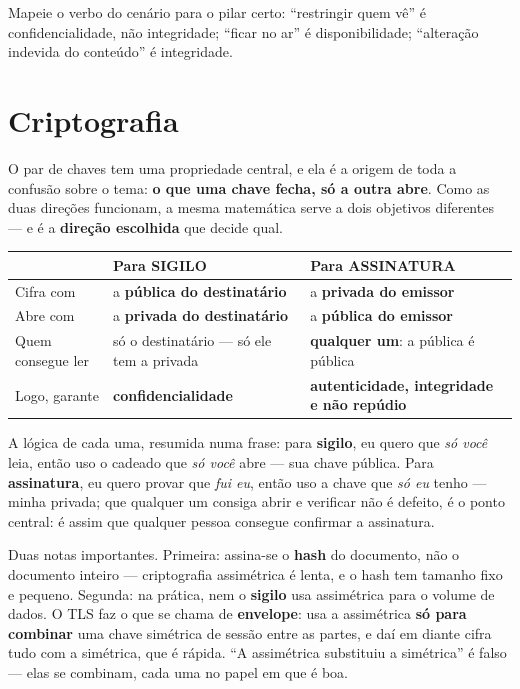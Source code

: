 \begin{cuidado}
Mapeie o verbo do cenário para o pilar certo: “restringir quem vê” é
confidencialidade, não integridade; “ficar no ar” é disponibilidade;
“alteração indevida do conteúdo” é integridade.
\end{cuidado}

\section{Criptografia}

\begin{conceito}
O par de chaves tem uma propriedade central, e ela é a origem de toda a
confusão sobre o tema: \textbf{o que uma chave fecha, só a outra abre}.
Como as duas direções funcionam, a mesma matemática serve a dois objetivos
diferentes --- e é a \textbf{direção escolhida} que decide qual.

\begin{center}
\begin{tabular}{@{}p{2.6cm}p{4.4cm}p{4.6cm}@{}}
\toprule
& \textbf{Para SIGILO} & \textbf{Para ASSINATURA} \\
\midrule
Cifra com & a \textbf{pública do destinatário} & a \textbf{privada do
emissor} \\
Abre com & a \textbf{privada do destinatário} & a \textbf{pública do
emissor} \\
Quem consegue ler & só o destinatário --- só ele tem a privada &
\textbf{qualquer um}: a pública é pública \\
Logo, garante & \textbf{confidencialidade} & \textbf{autenticidade,
integridade e não repúdio} \\
\bottomrule
\end{tabular}
\end{center}

A lógica de cada uma, resumida numa frase: para \textbf{sigilo}, eu quero
que \textit{só você} leia, então uso o cadeado que \textit{só você} abre
--- sua chave pública. Para \textbf{assinatura}, eu quero provar que
\textit{fui eu}, então uso a chave que \textit{só eu} tenho --- minha
privada; que qualquer um consiga abrir e verificar não é defeito, é o
ponto central: é assim que qualquer pessoa consegue confirmar a
assinatura.

Duas notas importantes. Primeira: assina-se o \textbf{hash} do documento,
não o documento inteiro --- criptografia assimétrica é lenta, e o hash tem
tamanho fixo e pequeno. Segunda: na prática, nem o \textbf{sigilo} usa
assimétrica para o volume de dados. O TLS faz o que se chama de
\textbf{envelope}: usa a assimétrica \textbf{só para combinar} uma chave
simétrica de sessão entre as partes, e daí em diante cifra tudo com a
simétrica, que é rápida. “A assimétrica substituiu a simétrica” é falso
--- elas se combinam, cada uma no papel em que é boa.
\end{conceito}

